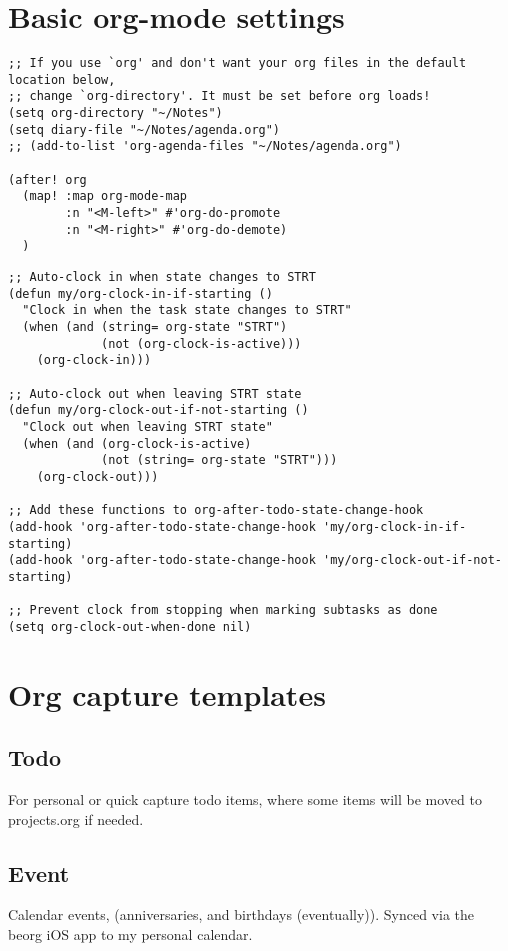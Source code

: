 \documentclass[11pt]{article}
\begin{document}
\section{Basic org-mode settings}
\label{sec:org55720de}
\begin{verbatim}
;; If you use `org' and don't want your org files in the default location below,
;; change `org-directory'. It must be set before org loads!
(setq org-directory "~/Notes")
(setq diary-file "~/Notes/agenda.org")
;; (add-to-list 'org-agenda-files "~/Notes/agenda.org")

(after! org
  (map! :map org-mode-map
        :n "<M-left>" #'org-do-promote
        :n "<M-right>" #'org-do-demote)
  )
\end{verbatim}

\begin{verbatim}
;; Auto-clock in when state changes to STRT
(defun my/org-clock-in-if-starting ()
  "Clock in when the task state changes to STRT"
  (when (and (string= org-state "STRT")
             (not (org-clock-is-active)))
    (org-clock-in)))

;; Auto-clock out when leaving STRT state
(defun my/org-clock-out-if-not-starting ()
  "Clock out when leaving STRT state"
  (when (and (org-clock-is-active)
             (not (string= org-state "STRT")))
    (org-clock-out)))

;; Add these functions to org-after-todo-state-change-hook
(add-hook 'org-after-todo-state-change-hook 'my/org-clock-in-if-starting)
(add-hook 'org-after-todo-state-change-hook 'my/org-clock-out-if-not-starting)

;; Prevent clock from stopping when marking subtasks as done
(setq org-clock-out-when-done nil)
\end{verbatim}
\section{Org capture templates}
\label{sec:org6f667cc}
\subsection{Todo}
\label{sec:orgcef35b6}
For personal or quick capture todo items, where some items will be moved to projects.org if needed.
\subsection{Event}
\label{sec:org003eba0}
Calendar events, (anniversaries, and birthdays (eventually)). Synced via the beorg iOS app to my personal calendar.
\end{document}
